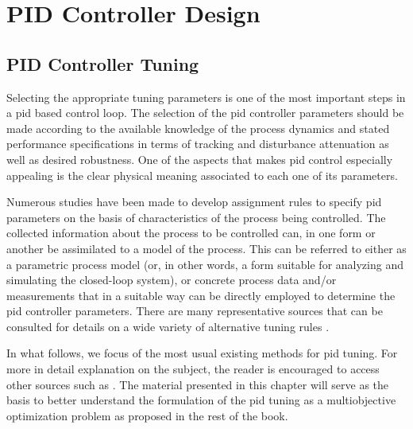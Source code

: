 \chapter{PID Controller Design}
\label{chap:PIDControllerDesign}

\section{PID Controller Tuning}
Selecting the appropriate tuning parameters is one of the most important steps in a \gls{pid} based control loop. The selection of the \gls{pid} controller parameters should be made according to the available knowledge of the process dynamics and stated performance specifications in terms of tracking and disturbance attenuation as well as desired robustness. One of the aspects that makes \gls{pid} control especially appealing is the clear physical meaning associated to each one of its parameters.

Numerous studies have been made to develop assignment rules to specify \gls{pid} parameters on the basis of characteristics of the process being controlled. The collected information about the process to be controlled can, in one form or another be assimilated to a model of the process. This can be referred to either as a parametric process model (or, in other words, a form suitable for analyzing and simulating the closed-loop system), or concrete process data and/or measurements that in a suitable way can be directly employed to determine the \gls{pid} controller parameters. There are many representative sources that can be consulted for details on a wide variety of alternative tuning rules  \citep{odwyer2006}.

In what follows, we focus of the most usual existing methods for \gls{pid} tuning. For more in detail explanation on the subject, the reader is encouraged to access other sources such as \citet{VilanovaBook2012}. The material presented in this chapter will serve as the basis to better understand the formulation of the \gls{pid} tuning as a multiobjective optimization problem as proposed in the rest of the book.


